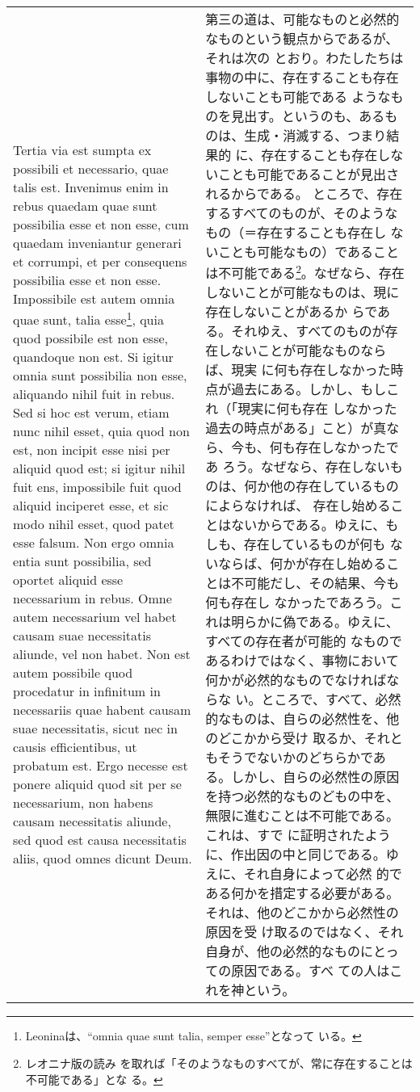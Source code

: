 \documentclass[10pt]{jsarticle} %
\begin{document}
\begin{longtable}{p{21em}p{21em}}
\\

Tertia via
est sumpta ex possibili et necessario, quae talis est. Invenimus enim in
rebus quaedam quae sunt possibilia esse et non esse, cum quaedam
inveniantur generari et corrumpi, et per consequens possibilia esse et
non esse. Impossibile est autem omnia quae sunt, talia
 esse\footnote{Leoninaは、``omnia quae sunt talia, semper esse''となって
 いる。}, quia quod
possibile est non esse, quandoque non est. Si igitur omnia sunt
possibilia non esse, aliquando nihil fuit in rebus. Sed si hoc est
verum, etiam nunc nihil esset, quia quod non est, non incipit esse nisi
per aliquid quod est; si igitur nihil fuit ens, impossibile fuit quod
aliquid inciperet esse, et sic modo nihil esset, quod patet esse
falsum. Non ergo omnia entia sunt possibilia, sed oportet aliquid esse
necessarium in rebus. Omne autem necessarium vel habet causam suae
necessitatis aliunde, vel non habet. Non est autem possibile quod
procedatur in infinitum in necessariis quae habent causam suae
necessitatis, sicut nec in causis efficientibus, ut probatum est. Ergo
necesse est ponere aliquid quod sit per se necessarium, non habens
causam necessitatis aliunde, sed quod est causa necessitatis aliis, quod
omnes dicunt Deum. 


& 第三の道は、可能なものと必然的なものという観点からであるが、それは次の
とおり。わたしたちは事物の中に、存在することも存在しないことも可能である
ようなものを見出す。というのも、あるものは、生成・消滅する、つまり結果的
に、存在することも存在しないことも可能であることが見出されるからである。
ところで、存在するすべてのものが、そのようなもの（＝存在することも存在し
ないことも可能なもの）であることは不可能である\footnote{レオニナ版の読み
を取れば「そのようなものすべてが、常に存在することは不可能である」とな
る。}。なぜなら、存在しないことが可能なものは、現に存在しないことがあるか
らである。それゆえ、すべてのものが存在しないことが可能なものならば、現実
に何も存在しなかった時点が過去にある。しかし、もしこれ（「現実に何も存在
しなかった過去の時点がある」こと）が真なら、今も、何も存在しなかったであ
ろう。なぜなら、存在しないものは、何か他の存在しているものによらなければ、
存在し始めることはないからである。ゆえに、もしも、存在しているものが何も
ないならば、何かが存在し始めることは不可能だし、その結果、今も何も存在し
なかったであろう。これは明らかに偽である。ゆえに、すべての存在者が可能的
なものであるわけではなく、事物において何かが必然的なものでなければならな
い。ところで、すべて、必然的なものは、自らの必然性を、他のどこかから受け
取るか、それともそうでないかのどちらかである。しかし、自らの必然性の原因
を持つ必然的なものどもの中を、無限に進むことは不可能である。これは、すで
に証明されたように、作出因の中と同じである。ゆえに、それ自身によって必然
的である何かを措定する必要がある。それは、他のどこかから必然性の原因を受
け取るのではなく、それ自身が、他の必然的なものにとっての原因である。すべ
ての人はこれを神という。




\end{longtable}
\end{document}
